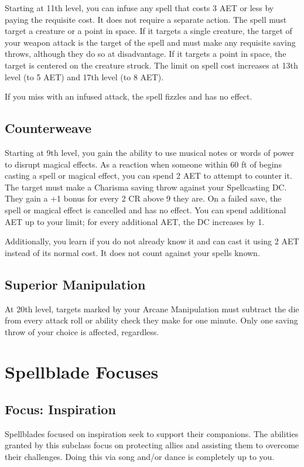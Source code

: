 Starting at 11th level, you can infuse any spell that costs 3 AET or less by paying the requisite cost. It does not require a separate action. The spell must target a creature or a point in space. If it targets a single creature, the target of your weapon attack is the target of the spell and must make any requisite saving throws, although they do so at disadvantage. If it targets a point in space, the target is centered on the creature struck. The limit on spell cost increases at 13th level (to 5 AET) and 17th level (to 8 AET).

If you miss with an infused attack, the spell fizzles and has no effect.

\subsection{Counterweave}

Starting at 9th level, you gain the ability to use musical notes or words of power to disrupt magical effects. As a reaction when someone within 60 ft of begins casting a spell or magical effect, you can spend 2 AET to attempt to counter it. The target must make a Charisma saving throw against your Spellcasting DC. They gain a +1 bonus for every 2 CR above 9 they are. On a failed save, the spell or magical effect is cancelled and has no effect. You can spend additional AET up to your limit; for every additional AET, the DC increases by 1.

Additionally, you learn \textit{} if you do not already know it and can cast it using 2 AET instead of its normal cost. It does not count against your spells known.

\subsection{Superior Manipulation}

At 20th level, targets marked by your Arcane Manipulation must subtract the die from every attack roll or ability check they make for one minute. Only one saving throw of your choice is affected, regardless.

\section{Spellblade Focuses}
\subsection{Focus: Inspiration}
Spellblades focused on inspiration seek to support their companions. The abilities granted by this subclass focus on protecting allies and assisting them to overcome their challenges. Doing this via song and/or dance is completely up to you.

